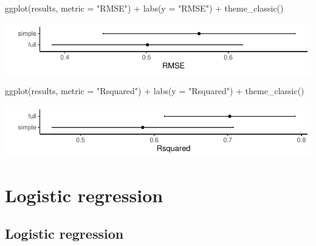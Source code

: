 \documentclass[a4paper]{article}
\begin{document}
\begin{Schunk}
{}

\begin{Sinput}
ggplot(results, metric = "RMSE") +
  labs(y = "RMSE") +
  theme_classic()
\end{Sinput}


{\centering \includegraphics[width=\maxwidth]{figure/listings-unnamed-chunk-407-2} 

}

\begin{Sinput}
ggplot(results, metric = "Rsquared") +
  labs(y = "Rsquared") +
  theme_classic()
\end{Sinput}


{\centering \includegraphics[width=\maxwidth]{figure/listings-unnamed-chunk-407-3} 

}

\end{Schunk}
\newpage

\section{Logistic regression}\label{sec:31}
\subsection{Logistic regression}
\end{document}
